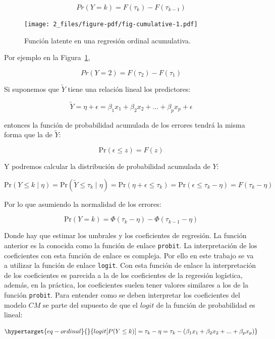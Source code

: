 \documentclass[
  12pt,
  a4paper,
  extrafontsizes,
  onecolumn,
  openright,
  table]{memoir}
\begin{document}
\[Pr(Y = k) = F(\tau_k) - F(\tau_{k-1})\]

\begin{figure}[h]

{\centering \texttt{[image: 2\_files/figure-pdf/fig-cumulative-1.pdf]}

}

\caption{\label{fig-cumulative}Función latente en una regresión ordinal
acumulativa.}

\end{figure}

Por ejemplo en la Figura~\ref{fig-cumulative},

\[Pr(Y = 2) = F(\tau_2) - F(\tau_{1})\]

Si suponemos que \(\tilde{Y}\) tiene una relación lineal los
predictores:

\[\tilde{Y} = \eta + \epsilon = \beta_1 x_1 + \beta_2 x_2 + ... + \beta_p x_p + \epsilon\]

entonces la función de probabilidad acumulada de los errores tendrá la
misma forma que la de \(\tilde{Y}\):

\[\mathrm{Pr}(\epsilon \leq z) = F(z)\]

Y podremos calcular la distribución de probabilidad acumulada de \(Y\):

\[\mathrm{Pr}(Y \leq k \mid \eta) = \mathrm{Pr}(\tilde{Y} \leq \tau_k \mid \eta) = \mathrm{Pr}(\eta + \epsilon \leq \tau_k) = \mathrm{Pr}(\epsilon \leq \tau_k - \eta) = F(\tau_k - \eta)\]

Por lo que asumiendo la normalidad de los errores:

\[\mathrm{Pr}(Y = k) = \Phi(\tau_k - \eta) - \Phi(\tau_{k - 1} - \eta)\]

Donde hay que estimar los umbrales y los coeficientes de regresión. La
función anterior es la conocida como la función de enlace
\texttt{probit}. La interpretación de los coeficientes con esta función
de enlace es compleja. Por ello en este trabajo se va a utilizar la
función de enlace \texttt{logit}. Con esta función de enlace la
interpretación de los coeficientes es parecida a la de los coeficientes
de la regresión logística, además, en la práctica, los coeficientes
suelen tener valores similares a los de la función \texttt{probit}. Para
entender como se deben interpretar los coeficientes del modelo \(CM\) se
parte del supuesto de que el \(logit\) de la función de probabilidad es
lineal:

\begin{equation}\protect\hypertarget{eq-ordinal}{}{
logit [P(Y \le k)] = \tau_{k} - \eta = \tau_{k} - (\beta_1 x_1 + \beta_2 x_2 + ... + \beta_p x_p)
}\label{eq-ordinal}\end{equation}
\end{document}
